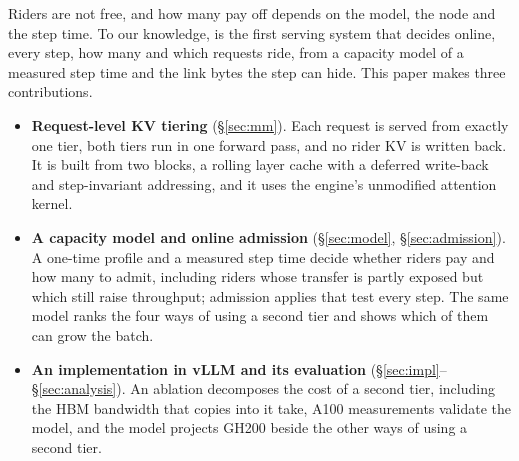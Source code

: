 Riders are not free, and how many pay off depends on the model, the node and
the step time. To our knowledge, \sysname{} is the first serving system that
decides online, every step, how many and which requests ride, from a capacity
model of a measured step time and the link bytes the step can hide. This paper
makes three contributions.
\begin{itemize}\itemsep1pt
\item \textbf{Request-level KV tiering} (\S\ref{sec:mm}). Each request is
  served from exactly one tier, both tiers run in one forward pass, and no
  rider KV is written back. It is built from two blocks, a rolling layer cache
  with a deferred write-back and step-invariant addressing, and it uses the
  engine's unmodified attention kernel.
\item \textbf{A capacity model and online admission} (\S\ref{sec:model},
  \S\ref{sec:admission}). A one-time profile and a measured step time decide
  whether riders pay and how many to admit, including riders whose transfer
  is partly exposed but which still raise throughput; admission applies that
  test every step. The same model ranks the four ways of using a second tier
  and shows which of them can grow the batch.
\item \textbf{An implementation in vLLM and its evaluation}
  (\S\ref{sec:impl}--\S\ref{sec:analysis}). An ablation decomposes the cost of
  a second tier, including the HBM bandwidth that copies into it take, A100
  measurements validate the model, and the model projects GH200 beside the
  other ways of using a second tier.
\end{itemize}
